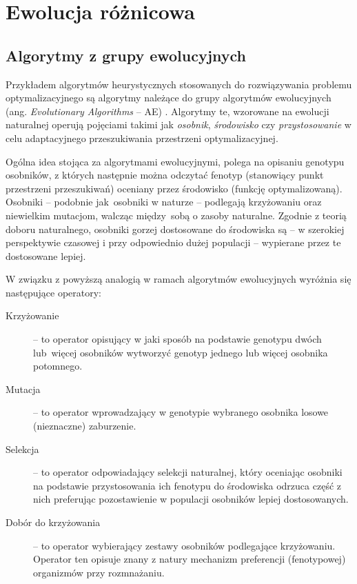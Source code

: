 \documentclass[12pt,a4paper]{report}
\begin{document}
{{%
\section{Ewolucja różnicowa}
\label{DEvolChapter}

\subsection{Algorytmy z grupy ewolucyjnych}
\par{
Przykładem algorytmów heurystycznych stosowanych do rozwiązywania problemu optymalizacyjnego są algorytmy należące do grupy algorytmów ewolucyjnych (ang. \emph{Evolutionary Algorithms} -- AE) \cite{WykladyEvol,SpringerIntroToEvol}. Algorytmy te, wzorowane na ewolucji naturalnej operują pojęciami takimi jak \emph{osobnik}, \emph{środowisko} czy \emph{przystosowanie} w celu adaptacyjnego przeszukiwania przestrzeni optymalizacyjnej.
}
\par{
Ogólna idea stojąca za algorytmami ewolucyjnymi, polega na opisaniu genotypu osobników, z których następnie można odczytać fenotyp (stanowiący punkt przestrzeni przeszukiwań) oceniany przez środowisko (funkcję optymalizowaną). Osobniki -- podobnie jak~osobniki w naturze -- podlegają krzyżowaniu oraz niewielkim mutacjom, walcząc między~sobą o zasoby naturalne. Zgodnie z teorią doboru naturalnego, osobniki gorzej dostosowane do środowiska są -- w szerokiej perspektywie czasowej i przy odpowiednio dużej populacji -- wypierane przez te dostosowane lepiej.
}
\par{
W związku z powyższą analogią w ramach algorytmów ewolucyjnych wyróżnia się następujące operatory:
\begin{description}
  \item[Krzyżowanie] -- to operator opisujący w jaki sposób na podstawie genotypu dwóch lub~więcej osobników wytworzyć genotyp jednego lub więcej osobnika potomnego.
  \item[Mutacja] -- to operator wprowadzający w genotypie wybranego osobnika losowe (nieznaczne) zaburzenie.
  \item[Selekcja] -- to operator odpowiadający selekcji naturalnej, który oceniając osobniki na podstawie przystosowania ich fenotypu do środowiska odrzuca część z nich preferując pozostawienie w populacji osobników lepiej dostosowanych.
  \item[Dobór do krzyżowania] -- to operator wybierający zestawy osobników podlegające krzyżowaniu. Operator ten opisuje znany z natury mechanizm preferencji (fenotypowej) organizmów przy rozmnażaniu.

\end{description}}}}
\end{document}
